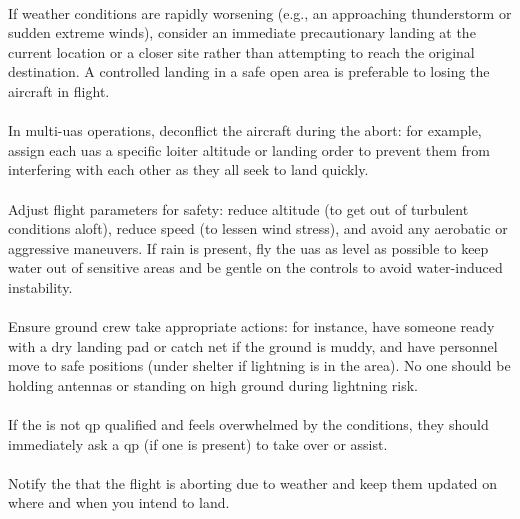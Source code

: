                 \paragraph{} If weather conditions are rapidly worsening (e.g., an approaching thunderstorm or sudden extreme winds), consider an immediate precautionary landing at the current location or a closer site rather than attempting to reach the original destination. A controlled landing in a safe open area is preferable to losing the aircraft in flight.
                \paragraph{} In multi-\ac{uas} operations, deconflict the aircraft during the abort: for example, assign each \ac{uas} a specific loiter altitude or landing order to prevent them from interfering with each other as they all seek to land quickly.
                \paragraph{} Adjust flight parameters for safety: reduce altitude (to get out of turbulent conditions aloft), reduce speed (to lessen wind stress), and avoid any aerobatic or aggressive maneuvers. If rain is present, fly the \ac{uas} as level as possible to keep water out of sensitive areas and be gentle on the controls to avoid water-induced instability.
                \paragraph{} Ensure ground crew take appropriate actions: for instance, have someone ready with a dry landing pad or catch net if the ground is muddy, and have personnel move to safe positions (under shelter if lightning is in the area). No one should be holding antennas or standing on high ground during lightning risk.
                \paragraph{} If the  is not \ac{qp} qualified and feels overwhelmed by the conditions, they should immediately ask a \ac{qp} (if one is present) to take over or assist.
                \paragraph{} Notify the  that the flight is aborting due to weather and keep them updated on where and when you intend to land.
